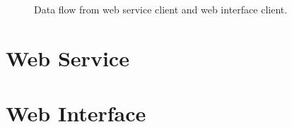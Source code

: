\begin{figure}[H]
\centering
\captionsetup{justification=centering}
\caption{Data flow from web service client and web interface client.}
\label{fig:mvc}
\end{figure}

\section{Web Service}
\label{sec:ws}

\section{Web Interface}
\label{sec:wi}

